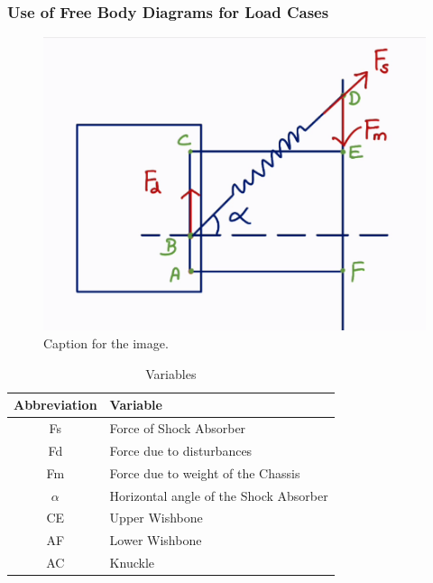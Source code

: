\subsubsection{Use of Free Body Diagrams for Load Cases}
\begin{figure}[ht!]
  \centering
  \includegraphics[width=\linewidth]{texfiles/mech/eimg/suspension/fbd.png}
  \caption{Caption for the image.}
  \label{fig:image1}
\end{figure}

\begin{table}[H]
\centering
\caption{Variables}
\label{table:variables}
\begin{tabular}{|c|l|}
\hline
\textbf{Abbreviation} & \textbf{Variable} \\ \hline
Fs & Force of Shock Absorber \\ \hline
Fd & Force due to disturbances \\ \hline
Fm & Force due to weight of the Chassis \\ \hline
$\alpha$ & Horizontal angle of the Shock Absorber \\ \hline
CE & Upper Wishbone \\ \hline
AF & Lower Wishbone \\ \hline
AC & Knuckle \\ \hline
\end{tabular}
\end{table}



